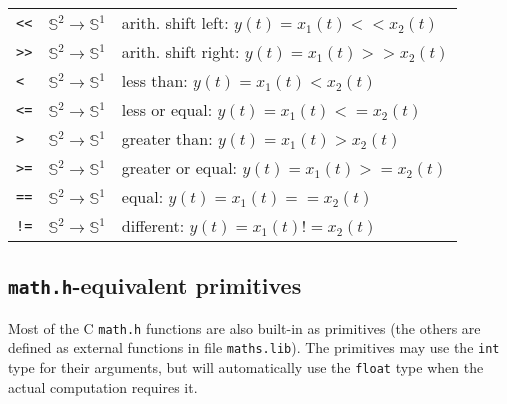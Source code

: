 \begin{tabular}{|l|l|l|}
	\texttt{<}\texttt{<} & $\mathbb{S}^{2}\rightarrow\mathbb{S}^{1}$ & arith. shift left: $y(t)=x_{1}(t) << x_{2}(t)$           \\
	\texttt{>}\texttt{>} & $\mathbb{S}^{2}\rightarrow\mathbb{S}^{1}$ & arith. shift right: $y(t)=x_{1}(t) >> x_{2}(t)$          \\


	\texttt{<}           & $\mathbb{S}^{2}\rightarrow\mathbb{S}^{1}$ & less than: $y(t)=x_{1}(t) < x_{2}(t)$                    \\
	\texttt{<=}          & $\mathbb{S}^{2}\rightarrow\mathbb{S}^{1}$ & less or equal: $y(t)=x_{1}(t) <= x_{2}(t)$               \\
	\texttt{>}           & $\mathbb{S}^{2}\rightarrow\mathbb{S}^{1}$ & greater than: $y(t)=x_{1}(t) > x_{2}(t)$                 \\
	\texttt{>=}          & $\mathbb{S}^{2}\rightarrow\mathbb{S}^{1}$ & greater or equal: $y(t)=x_{1}(t) >= x_{2}(t)$            \\
	\texttt{==}          & $\mathbb{S}^{2}\rightarrow\mathbb{S}^{1}$ & equal: $y(t)=x_{1}(t) == x_{2}(t)$                       \\
	\texttt{!=}          & $\mathbb{S}^{2}\rightarrow\mathbb{S}^{1}$ & different: $y(t)=x_{1}(t) != x_{2}(t)$                   \\

	\hline
\end{tabular}

\bigskip

\subsection{\texttt{math.h}-equivalent primitives}

Most of the C \texttt{math.h} functions are also built-in as primitives (the others are defined as external functions in file \texttt{maths.lib}).
The primitives may use the \texttt{int} type for their arguments, but will automatically use the \texttt{float} type when the actual computation requires it.

\bigskip

